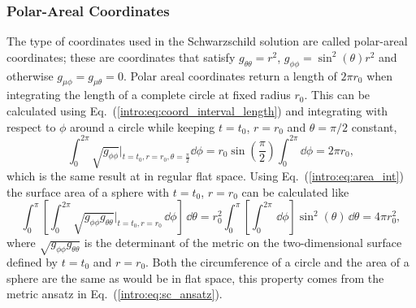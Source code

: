 \subsubsection*{Polar-Areal Coordinates }
The type of coordinates used in the Schwarzschild solution are called polar-areal coordinates; these are coordinates that satisfy $g_{\theta\theta}=r^2$, $g_{\phi\phi} = \sin^2(\theta)r^2$ and otherwise $g_{\mu\phi}=g_{\mu\theta}=0$. Polar areal coordinates return a length of $2\pi r_0$ when integrating the length of a complete circle at fixed radius $r_0$. This can be calculated using Eq.~(\ref{intro:eq:coord_interval_length}) and integrating with respect to $\phi$ around a circle while keeping $t=t_0$, $r=r_0$ and $\theta=\pi/2$ constant,
\begin{equation}
\int_0^{2\pi} \sqrt{g_{\phi\phi}}\Big|_{t=t_0,r=r_0,\theta=\frac{\pi}{2}} \dd \phi =  r_0 \sin \left(\frac{\pi}{2}\right) \int_0^{2\pi} \dd \phi = 2 \pi r_0,
\end{equation}
which is the same result at in regular flat space. Using Eq.~(\ref{intro:eq:area_int}) the surface area of a sphere with $t=t_0$, $r=r_0$ can be calculated like
\begin{equation}
\int_0^\pi\left[\int_0^{2\pi} \sqrt{g_{\phi\phi} g_{\theta\theta}}\Big|_{t=t_0,r=r_0} \,\dd \phi\right] \,\dd \theta=  r_0^2 \int_0^\pi\left[\int_0^{2\pi} \,\dd \phi\right]  \sin^2(\theta)\,\dd \theta = 4 \pi r_0^2,
\end{equation}
where $\sqrt{g_{\phi\phi} g_{\theta\theta}}$ is the determinant of the metric on the two-dimensional surface defined by $t=t_0$ and $r=r_0$. Both the circumference of a circle and the area of a sphere are the same as would be in flat space, this property comes from the metric ansatz in Eq.~(\ref{intro:eq:sc_ansatz}).









